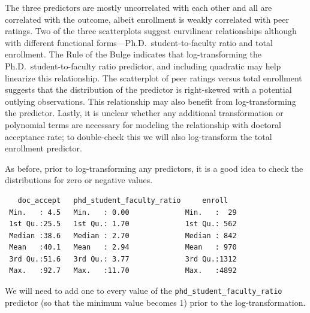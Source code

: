 \documentclass[]{book}
\newenvironment{Shaded}{\begin{snugshade}}{\end{snugshade}}
\newcommand{\CommentTok}[1]{\textcolor[rgb]{0.56,0.35,0.01}{\textit{#1}}}
\newcommand{\DataTypeTok}[1]{\textcolor[rgb]{0.13,0.29,0.53}{#1}}
\newcommand{\DecValTok}[1]{\textcolor[rgb]{0.00,0.00,0.81}{#1}}
\newcommand{\KeywordTok}[1]{\textcolor[rgb]{0.13,0.29,0.53}{\textbf{#1}}}
\newcommand{\NormalTok}[1]{#1}
\newcommand{\OperatorTok}[1]{\textcolor[rgb]{0.81,0.36,0.00}{\textbf{#1}}}
\newcommand{\StringTok}[1]{\textcolor[rgb]{0.31,0.60,0.02}{#1}}
\begin{document}
The three predictors are mostly uncorrelated with each other and all are correlated with the outcome, albeit enrollment is weakly correlated with peer ratings. Two of the three scatterplots suggest curvilinear relationships although with different functional forms---Ph.D.~student-to-faculty ratio and total enrollment. The Rule of the Bulge indicates that log-transforming the Ph.D.~student-to-faculty ratio predictor, and including quadratic may help linearize this relationship. The scatterplot of peer ratings versus total enrollment suggests that the distribution of the predictor is right-skewed with a potential outlying observations. This relationship may also benefit from log-transforming the predictor. Lastly, it is unclear whether any additional transformation or polynomial terms are necessary for modeling the relationship with doctoral acceptance rate; to double-check this we will also log-transform the total enrollment predictor.

As before, prior to log-transforming any predictors, it is a good idea to check the distributions for zero or negative values.

\begin{Shaded}
\end{Shaded}

\begin{verbatim}
   doc_accept   phd_student_faculty_ratio     enroll    
 Min.   : 4.5   Min.   : 0.00             Min.   :  29  
 1st Qu.:25.5   1st Qu.: 1.70             1st Qu.: 562  
 Median :38.6   Median : 2.70             Median : 842  
 Mean   :40.1   Mean   : 2.94             Mean   : 970  
 3rd Qu.:51.6   3rd Qu.: 3.77             3rd Qu.:1312  
 Max.   :92.7   Max.   :11.70             Max.   :4892  
\end{verbatim}

We will need to add one to every value of the \texttt{phd\_student\_faculty\_ratio} predictor (so that the minimum value becomes 1) prior to the log-transformation.

\begin{Shaded}
\end{Shaded}
\end{document}

